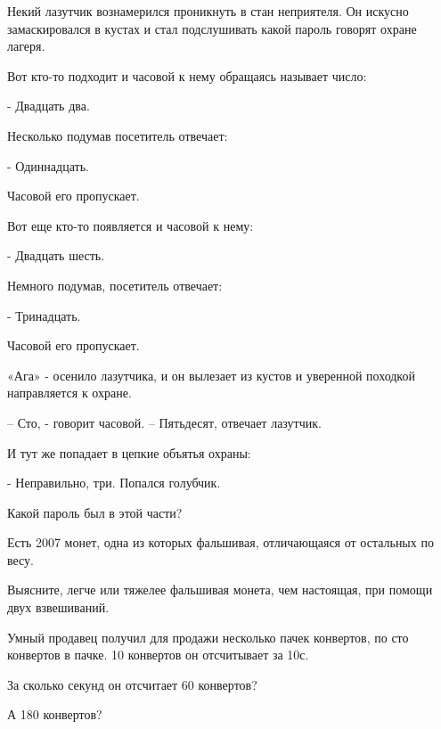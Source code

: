 \begin{problem}

Некий лазутчик вознамерился проникнуть в стан неприятеля. Он искусно замаскировался в кустах и стал подслушивать какой пароль говорят охране лагеря. 

Вот кто-то подходит и часовой к нему обращаясь называет число: 

- Двадцать два. 

Несколько подумав посетитель отвечает: 

- Одиннадцать.

Часовой его пропускает.

Вот еще кто-то появляется и часовой к нему: 

- Двадцать шесть. 

Немного подумав, посетитель отвечает: 

- Тринадцать. 

Часовой его пропускает. 

«Ага» - осенило лазутчика, и он вылезает из кустов и уверенной походкой направляется к охране. 

– Сто, - говорит часовой. – Пятьдесят, отвечает лазутчик. 

И тут же попадает в цепкие объятья охраны: 

- Неправильно, три. Попался голубчик. 

Какой пароль был в этой части?  

\end{problem}
\begin{problem}

Есть 2007 монет, одна из которых фальшивая, отличающаяся от остальных по весу. 

Выясните, легче или тяжелее фальшивая монета, чем настоящая, при помощи двух взвешиваний.

\end{problem}
\begin{problem}

Умный продавец получил для продажи несколько пачек конвертов, по сто конвертов в пачке. 10 конвертов он отсчитывает за 10с. 

За сколько секунд он отсчитает 60 конвертов? 

А 180 конвертов?

\end{problem}